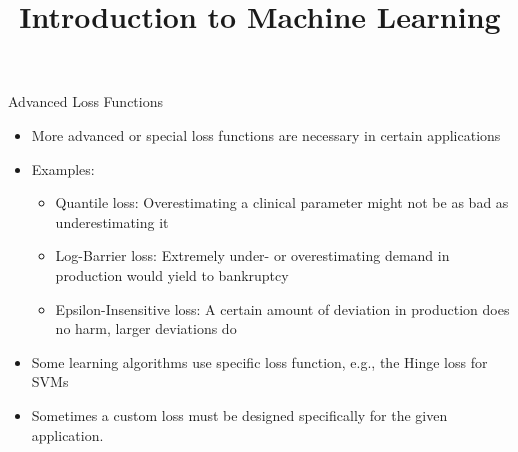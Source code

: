 




\newcommand{\titlefigure}{figure_man/optimization_steps.jpeg}
\newcommand{\learninggoals}{
  \item Know the Log-Barrier loss
  \item Know the Epsilon-Insensitive loss
  \item Know the Quantile loss
}

\title{Introduction to Machine Learning}
\date{}





\begin{vbframe}{Advanced Loss Functions}
\begin{itemize}
\item More advanced or special loss functions are necessary in certain applications
\item Examples:
\begin{itemize}
\item Quantile loss: Overestimating a clinical parameter might not be as bad as underestimating it
\item Log-Barrier loss: Extremely under- or overestimating demand in production would yield to bankruptcy
\item Epsilon-Insensitive loss: A certain amount of deviation in production does no harm, larger deviations do
\end{itemize}
\item Some learning algorithms use specific loss function, e.g., the Hinge loss for SVMs
\item Sometimes a custom loss must be designed specifically for the given application.
\end{itemize}
\end{vbframe}


